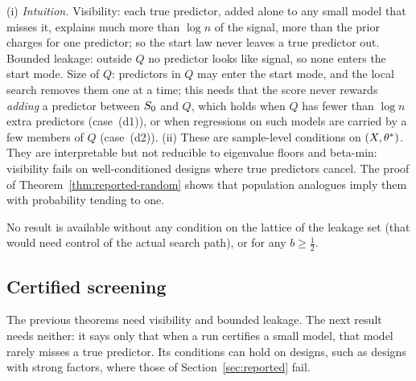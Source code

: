 
\begin{remark}\label{rem:reported-fixed}
(i) \emph{Intuition.} Visibility: each true predictor, added alone to any small model that misses it, explains much more
than $\log n$ of the signal, more than the prior charges for one predictor; so the start law never leaves a true predictor
out. Bounded leakage: outside $Q$ no predictor looks like signal, so none enters the start mode. Size of $Q$: predictors
in $Q$ may enter the start mode, and the local search removes them one at a time; this needs that the score never rewards
\emph{adding} a predictor between $S_0$ and $Q$, which holds when $Q$ has fewer than $\log n$ extra predictors
(case~(d1)), or when regressions on such models are carried by a few members of $Q$ (case~(d2)).
(ii) These are sample-level conditions on $(X,\theta^*)$. They are interpretable but not reducible to eigenvalue floors and
beta-min: visibility fails on well-conditioned designs where true predictors cancel. The proof of
Theorem~\ref{thm:reported-random} shows that population analogues imply them with probability tending to one.
\end{remark}

\begin{remark}\label{rem:reported-not}
No result is available without any condition on the lattice of the leakage set (that would need control of the actual
search path), or for any $b\ge\tfrac12$.
\end{remark}

\subsection{Certified screening}\label{sec:screen}

The previous theorems need visibility and bounded leakage. The next result needs neither: it says only that when a run
certifies a small model, that model rarely misses a true predictor. Its conditions can hold on designs, such as designs
with strong factors, where those of Section~\ref{sec:reported} fail.



